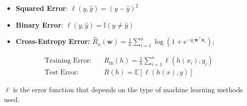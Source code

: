 \begin{itemize}
    \item \textbf{Squared Error}: \( \ell(y, \widehat{y}) = (y - \widehat{y})^2 \)
    \item \textbf{Binary Error}: \( \ell(y, \widehat{y}) = \mathbb{I}(y \neq \widehat{y}) \)
    \item \textbf{Cross-Entropy Error:} \(\widehat R_n(\mathbf{w})=\frac1n\sum_{i=1}^n\log\left(1+e^{-y_i\mathbf{w}^\top\mathbf{x}_i}\right)\);
\end{itemize}


\begin{align*}
    \text{Training Error:} \quad & R_{\text{in}}(h) = \frac{1}{n} \sum_{i=1}^{n} \ell(h(x_i), y_i) \\
    \text{Test Error:} \quad & R(h) = \mathbb{E}[\ell(h(x), y)]
\end{align*}

$\ell$ is the error function that depends on the type of machine learning methods used.

